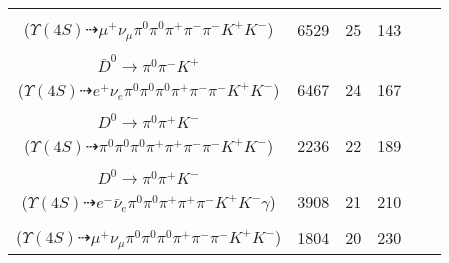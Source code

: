\documentclass[landscape]{article}
\newcounter{rownumbers}
\newcommand\rn{\stepcounter{rownumbers}\arabic{rownumbers}}
\newcommand{\EOLP}{\\ \hline} %
\newcommand{\topoTags}[1]{#1} %
\begin{document}
\begin{longtable}{clcccc}
\rn & \makecell[l]{ $ 
\Upsilon(4S) \rightarrow B^{+} B^{-} ,
B^{+} \rightarrow \mu^{+} \nu_{\mu} \bar{D}^{0} ,
B^{-} \rightarrow \rho^{-} D^{0} ,
\bar{D}^{0} \rightarrow \pi^{0} \pi^{-} K^{+} ,
\rho^{-} \rightarrow \pi^{0} \pi^{-} ,
D^{0} \rightarrow \pi^{+} K^{-} 
$ \\ ($
\Upsilon(4S) \dashrightarrow \mu^{+} \nu_{\mu} \pi^{0} \pi^{0} \pi^{+} \pi^{-} \pi^{-} K^{+} K^{-} 
$) } & \topoTags{6529 & }25 & 143 \EOLP

\rn & \makecell[l]{ $ 
\Upsilon(4S) \rightarrow B^{+} B^{-} ,
B^{+} \rightarrow e^{+} \nu_{e} \bar{D}^{*0} ,
B^{-} \rightarrow \rho^{-} D^{0} ,
\bar{D}^{*0} \rightarrow \pi^{0} \bar{D}^{0} ,
\rho^{-} \rightarrow \pi^{0} \pi^{-} ,
D^{0} \rightarrow \pi^{+} K^{-} ,
$ \\ $
\bar{D}^{0} \rightarrow \pi^{0} \pi^{-} K^{+} 
$ \\ ($
\Upsilon(4S) \dashrightarrow e^{+} \nu_{e} \pi^{0} \pi^{0} \pi^{0} \pi^{+} \pi^{-} \pi^{-} K^{+} K^{-} 
$) } & \topoTags{6467 & }24 & 167 \EOLP

\rn & \makecell[l]{ $ 
\Upsilon(4S) \rightarrow B^{+} B^{-} ,
B^{+} \rightarrow \rho^{+} \bar{D}^{0} ,
B^{-} \rightarrow \rho^{-} D^{0} ,
\rho^{+} \rightarrow \pi^{0} \pi^{+} ,
\bar{D}^{0} \rightarrow \pi^{-} K^{+} ,
\rho^{-} \rightarrow \pi^{0} \pi^{-} ,
$ \\ $
D^{0} \rightarrow \pi^{0} \pi^{+} K^{-} 
$ \\ ($
\Upsilon(4S) \dashrightarrow \pi^{0} \pi^{0} \pi^{0} \pi^{+} \pi^{+} \pi^{-} \pi^{-} K^{+} K^{-} 
$) } & \topoTags{2236 & }22 & 189 \EOLP

\rn & \makecell[l]{ $ 
\Upsilon(4S) \rightarrow B^{+} B^{-} ,
B^{+} \rightarrow \rho^{+} \bar{D}^{0} ,
B^{-} \rightarrow e^{-} \bar{\nu}_{e} D^{*0} ,
\rho^{+} \rightarrow \pi^{0} \pi^{+} ,
\bar{D}^{0} \rightarrow \pi^{-} K^{+} ,
D^{*0} \rightarrow D^{0} \gamma ,
$ \\ $
D^{0} \rightarrow \pi^{0} \pi^{+} K^{-} 
$ \\ ($
\Upsilon(4S) \dashrightarrow e^{-} \bar{\nu}_{e} \pi^{0} \pi^{0} \pi^{+} \pi^{+} \pi^{-} K^{+} K^{-} \gamma 
$) } & \topoTags{3908 & }21 & 210 \EOLP

\rn & \makecell[l]{ $ 
\Upsilon(4S) \rightarrow B^{+} B^{-} ,
B^{+} \rightarrow \mu^{+} \nu_{\mu} \bar{D}^{0} ,
B^{-} \rightarrow \rho^{-} D^{0} ,
\bar{D}^{0} \rightarrow \pi^{0} \pi^{-} K^{+} ,
\rho^{-} \rightarrow \pi^{0} \pi^{-} ,
D^{0} \rightarrow \pi^{0} \pi^{+} K^{-} 
$ \\ ($
\Upsilon(4S) \dashrightarrow \mu^{+} \nu_{\mu} \pi^{0} \pi^{0} \pi^{0} \pi^{+} \pi^{-} \pi^{-} K^{+} K^{-} 
$) } & \topoTags{1804 & }20 & 230 \EOLP


\end{longtable}
\end{document}
